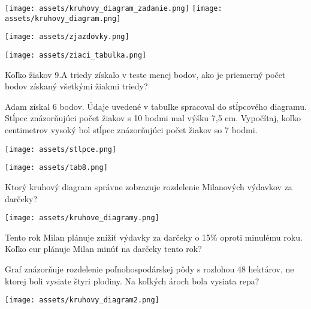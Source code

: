 \begin{example}
	\begin{center}
		\texttt{[image: assets/kruhovy\_diagram\_zadanie.png]}
		\texttt{[image: assets/kruhovy\_diagram.png]}
	\end{center}
\end{example}

\begin{example}
	\begin{center}
		\texttt{[image: assets/zjazdovky.png]}
	\end{center}
\end{example}

\begin{center}
	\texttt{[image: assets/ziaci\_tabulka.png]}
\end{center}

\begin{example}
	Koľko žiakov 9.A triedy získalo v teste menej bodov, ako je priemerný počet bodov získaný všetkými žiakmi triedy?
\end{example}

\begin{example}
	Adam získal 6 bodov. Údaje uvedené v tabuľke spracoval do stĺpcového diagramu. Stĺpec znázorňujúci počet žiakov s 10 bodmi mal výšku 7,5 cm. Vypočítaj, koľko centimetrov vysoký bol stĺpec znázorňujúci počet žiakov so 7 bodmi.
	
	\begin{center}
		\texttt{[image: assets/stlpce.png]}
	\end{center}
\end{example}

\begin{center}
	\texttt{[image: assets/tab8.png]}
\end{center}

\begin{example}
	Ktorý kruhový diagram správne zobrazuje  rozdelenie Milanových výdavkov za darčeky?
	
	\begin{center}
		\texttt{[image: assets/kruhove\_diagramy.png]}
	\end{center}
\end{example}

\begin{example}
	Tento rok Milan plánuje znížiť výdavky za darčeky o 15\% oproti minulému roku. Koľko eur plánuje Milan minúť na darčeky tento rok?
\end{example}

\begin{example}
	Graf znázorňuje rozdelenie poľnohospodárskej pôdy s rozlohou 48 hektárov, ne ktorej boli vysiate štyri plodiny. Na koľkých ároch bola vysiata repa?
	
	\begin{center}
		\texttt{[image: assets/kruhovy\_diagram2.png]}
	\end{center}
\end{example}

